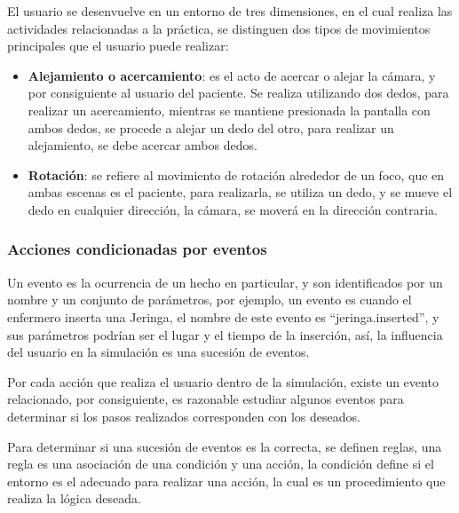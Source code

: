 El usuario se desenvuelve en un entorno de tres dimensiones, en el cual realiza las
actividades relacionadas a la práctica, se distinguen dos tipos de movimientos
principales que el usuario puede realizar:

\begin{itemize}
    \item \textbf{Alejamiento o acercamiento}: es el acto de acercar o alejar la
        cámara, y por consiguiente al usuario del paciente. Se realiza
        utilizando dos dedos, para realizar un acercamiento, mientras se
        mantiene presionada la pantalla con ambos dedos, se procede a alejar un
        dedo del otro, para realizar un alejamiento, se debe acercar ambos
        dedos.
    \item \textbf{Rotación}: se refiere al movimiento de rotación alrededor de
        un foco, que en ambas escenas es el paciente, para realizarla, se utiliza
        un dedo, y se mueve el dedo en cualquier dirección, la cámara, se moverá
        en la dirección contraria.
\end{itemize}


\subsubsection{Acciones condicionadas por eventos}


Un evento es la ocurrencia de un hecho en particular, y son identificados por un
nombre y un conjunto de parámetros, por ejemplo, un evento es cuando el
enfermero inserta una Jeringa, el nombre de este evento es
\enquote{jeringa.inserted}, y sus parámetros podrían ser el lugar y el tiempo de
la inserción, así, la influencia del usuario en la simulación es una sucesión de
eventos.

Por cada acción que realiza el usuario dentro de la simulación, existe un evento
relacionado, por consiguiente, es razonable estudiar algunos eventos para
determinar si los pasos realizados corresponden con los deseados. 

Para determinar si una sucesión de eventos es la correcta, se definen reglas,
una regla es una asociación de una condición y una acción, la condición define
si el entorno es el adecuado para realizar una acción, la cual es un
procedimiento que realiza la lógica deseada.

